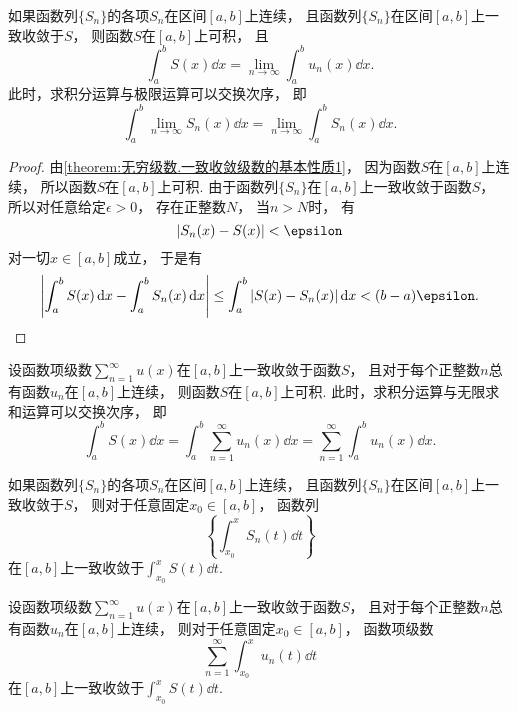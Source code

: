 \begin{theorem}\label{theorem:无穷级数.一致收敛级数的基本性质3}
如果函数列\(\{S_n\}\)的各项\(S_n\)在区间\([a,b]\)上连续，
且函数列\(\{S_n\}\)在区间\([a,b]\)上一致收敛于\(S\)，
则函数\(S\)在\([a,b]\)上可积，
且\[
	\int_a^b S(x) \dd{x}
	= \lim_{n\to\infty} \int_a^b u_n(x) \dd{x}.
\]
此时，求积分运算与极限运算可以交换次序，
即\[
	\int_a^b \lim_{n\to\infty} S_n(x) \dd{x}
	= \lim_{n\to\infty} \int_a^b S_n(x) \dd{x}.
\]
\begin{proof}
由\cref{theorem:无穷级数.一致收敛级数的基本性质1}，
因为函数\(S\)在\([a,b]\)上连续，
所以函数\(S\)在\([a,b]\)上可积.
由于函数列\(\{S_n\}\)在\([a,b]\)上一致收敛于函数\(S\)，
所以对任意给定\(\epsilon>0\)，
存在正整数\(N\)，
当\(n>N\)时，
有\[
	\abs{S_n(x) - S(x)} < \epsilon
\]对一切\(x\in[a,b]\)成立，
于是有\[
	\abs{\int_a^b S(x) \dd{x} - \int_a^b S_n(x) \dd{x}}
	\leq \int_a^b \abs{S(x) - S_n(x)} \dd{x}
	< (b-a) \epsilon.
	\qedhere
\]
\end{proof}
\end{theorem}
\begin{theorem}
设函数项级数\(\sum_{n=1}^\infty u(x)\)在\([a,b]\)上一致收敛于函数\(S\)，
且对于每个正整数\(n\)总有函数\(u_n\)在\([a,b]\)上连续，
则函数\(S\)在\([a,b]\)上可积.
此时，求积分运算与无限求和运算可以交换次序，
即\[
	\int_a^b S(x) \dd{x}
	= \int_a^b \sum_{n=1}^\infty u_n(x) \dd{x}
	= \sum_{n=1}^\infty \int_a^b u_n(x) \dd{x}.
\]
\end{theorem}
\begin{proposition}
如果函数列\(\{S_n\}\)的各项\(S_n\)在区间\([a,b]\)上连续，
且函数列\(\{S_n\}\)在区间\([a,b]\)上一致收敛于\(S\)，
则对于任意固定\(x_0\in[a,b]\)，
函数列\[
	\left\{\int_{x_0}^x S_n(t) \dd{t}\right\}
\]在\([a,b]\)上一致收敛于\(\int_{x_0}^x S(t) \dd{t}\).
\end{proposition}
\begin{proposition}
设函数项级数\(\sum_{n=1}^\infty u(x)\)在\([a,b]\)上一致收敛于函数\(S\)，
且对于每个正整数\(n\)总有函数\(u_n\)在\([a,b]\)上连续，
则对于任意固定\(x_0\in[a,b]\)，
函数项级数\[
	\sum_{n=1}^\infty \int_{x_0}^x u_n(t) \dd{t}
\]在\([a,b]\)上一致收敛于\(\int_{x_0}^x S(t) \dd{t}\).
\end{proposition}

